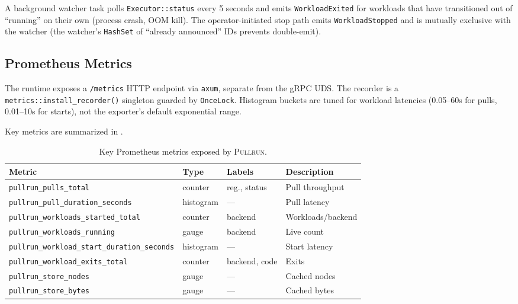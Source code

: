 \documentclass[11pt,a4paper]{article}
\newcommand{\pullrun}{\textsc{Pullrun}}
\begin{document}
A background watcher task polls \texttt{Executor::status} every 5 seconds and emits \texttt{WorkloadExited} for workloads that have transitioned out of ``running'' on their own (process crash, OOM kill). The operator-initiated stop path emits \texttt{WorkloadStopped} and is mutually exclusive with the watcher (the watcher's \texttt{HashSet} of ``already announced'' IDs prevents double-emit).

\subsection{Prometheus Metrics}

The runtime exposes a \texttt{/metrics} HTTP endpoint via \texttt{axum}, separate from the gRPC UDS. The recorder is a \texttt{metrics::install\_recorder()} singleton guarded by \texttt{OnceLock}. Histogram buckets are tuned for workload latencies (0.05--60s for pulls, 0.01--10s for starts), not the exporter's default exponential range.

Key metrics are summarized in .

\begin{table}[htbp]
    \centering
    \caption{Key Prometheus metrics exposed by \pullrun{}.}
    \label{tab:metrics}
    {\scriptsize\begin{tabular}{@{}p{5.8cm}lp{1.8cm}p{3cm}@{}}
        \toprule
        \textbf{Metric} & \textbf{Type} & \textbf{Labels} & \textbf{Description} \\
        \midrule
        \texttt{pullrun\_pulls\_total} & counter & reg., status & Pull throughput \\
        \texttt{pullrun\_pull\_duration\_seconds} & histogram & --- & Pull latency \\
        \texttt{pullrun\_workloads\_started\_total} & counter & backend & Workloads/backend \\
        \texttt{pullrun\_workloads\_running} & gauge & backend & Live count \\
        \texttt{pullrun\_workload\_start\_duration\_seconds} & histogram & --- & Start latency \\
        \texttt{pullrun\_workload\_exits\_total} & counter & backend, code & Exits \\
        \texttt{pullrun\_store\_nodes} & gauge & --- & Cached nodes \\
        \texttt{pullrun\_store\_bytes} & gauge & --- & Cached bytes \\
        \bottomrule
    \end{tabular}}
\end{table}
\end{document}
